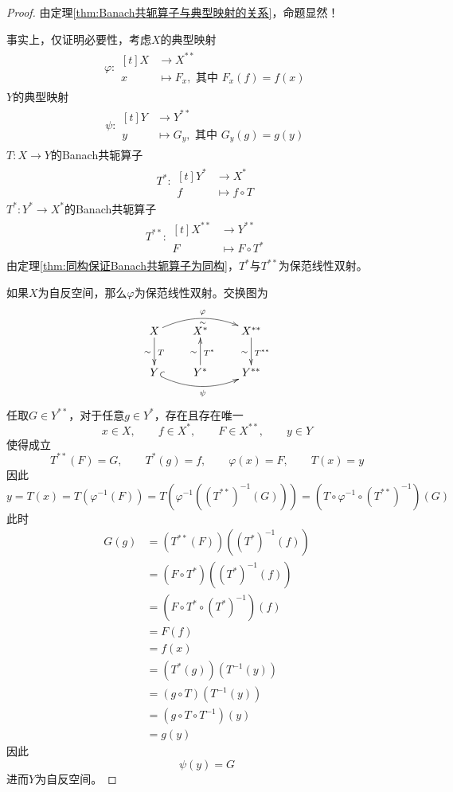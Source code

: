 \documentclass[lang = cn, scheme = chinese, thmcnt = section]{elegantbook}
\begin{document}
\begin{proof}
	由定理\ref{thm:Banach共轭算子与典型映射的关系}，命题显然！
	
	事实上，仅证明必要性，考虑$X$的典型映射
	\begin{align*}
		\varphi:\begin{aligned}[t]
			X&\longrightarrow X^{**}\\
			x&\longmapsto F_x,\text{ 其中 }F_x(f)=f(x)
		\end{aligned}
	\end{align*}
	$Y$​的典型映射
	\begin{align*}
		\psi:\begin{aligned}[t]
			Y&\longrightarrow Y^{**}\\
			y&\longmapsto G_y,\text{ 其中 }G_y(g)=g(y)
		\end{aligned}
	\end{align*}
	$T:X\to Y$的Banach共轭算子
	\begin{align*}
		T^*:\begin{aligned}[t]
			Y^*&\longrightarrow X^*\\
			f&\longmapsto f\circ T
		\end{aligned}
	\end{align*}
	$T^{*}:Y^*\to X^*$的Banach共轭算子
	\begin{align*}
		T^{**}:\begin{aligned}[t]
			X^{**}&\longrightarrow Y^{**}\\
			F&\longmapsto F\circ T^*
		\end{aligned}
	\end{align*}
	由定理\ref{thm:同构保证Banach共轭算子为同构}，$T^{*}$与$T^{**}$为保范线性双射。
	
	如果$X$为自反空间，那么$\varphi$为保范线性双射。交换图为
	$$
	\xymatrix{
		X \ar[d]^{T}_{\sim} \ar@/^1pc/[rr]^{\varphi}_{\sim} & X^{*} & X^{**} \ar[d]^{T^{**}}_{\sim}\\
		Y \ar@/_1pc/@{^{(}->}[rr]_{\psi} & Y^{*}  \ar[u]_{T^*}^{\sim} & Y^{**}
	}
	$$
	任取$G\in Y^{**}$，对于任意$g\in Y^*$，存在且存在唯一
	$$
	x\in X,\qquad 
	f\in X^{*},\qquad F\in X^{**},\qquad y\in Y
	$$
	使得成立
	$$
	T^{**}(F)=G,\qquad
	T^{*}(g)=f,\qquad 
	\varphi(x)=F,\qquad 
	T(x)=y
	$$
	因此
	$$
	y=T(x)=T(\varphi^{-1}(F))
	=T(\varphi^{-1}((T^{**})^{-1}(G)))
	=(T\circ \varphi^{-1}\circ (T^{**})^{-1})(G)
	$$
	此时
	\begin{align*}
		G(g)
		& = (T^{**}(F))((T^{*})^{-1}(f))\\
		& = (F\circ T^{*})((T^{*})^{-1}(f))\\
		& = (F\circ T^{*}\circ (T^{*})^{-1})(f)\\
		& = F(f)\\
		& = f(x)\\
		& = (T^*(g))(T^{-1}(y))\\
		& = (g\circ T)(T^{-1}(y))\\
		& = (g\circ T\circ T^{-1})(y)\\
		& = g(y)
	\end{align*}
	因此
	$$
	\psi(y)=G
	$$
	进而$Y$为自反空间。
\end{proof}
\end{document}
